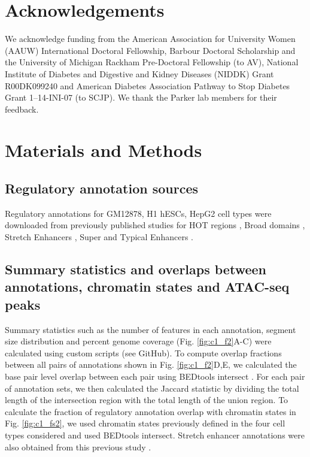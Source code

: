 \section{Acknowledgements}
We acknowledge funding from the American Association for University Women (AAUW) International Doctoral Fellowship, Barbour Doctoral Scholarship and the University of Michigan Rackham Pre-Doctoral Fellowship (to AV), National Institute of Diabetes and Digestive and Kidney Diseases (NIDDK) Grant R00DK099240 and American Diabetes Association Pathway to Stop Diabetes Grant 1–14-INI-07 (to SCJP). We thank the Parker lab members for their feedback.

\section{Materials and Methods}

\subsection{Regulatory annotation sources}
Regulatory annotations for GM12878, H1 hESCs, HepG2 cell types were downloaded from previously published studies for HOT regions \cite{boyleComparativeAnalysisRegulatory2014}, Broad domains \cite{benayounH3K4me3BreadthLinked2014}, Stretch Enhancers \cite{varshneyGeneticRegulatorySignatures2017}, Super and Typical Enhancers \cite{hniszSuperEnhancersControlCell2013}.

\subsection{Summary statistics and overlaps between annotations, chromatin states and ATAC-seq peaks}
Summary statistics such as the number of features in each annotation, segment size distribution and percent genome coverage (Fig. \ref{fig:c1_f2}A-C) were calculated using custom scripts (see GitHub). To compute overlap fractions between all pairs of annotations shown in Fig. \ref{fig:c1_f2}D,E, we calculated the base pair level overlap between each pair using BEDtools intersect \cite{quinlanBEDToolsFlexibleSuite2010}. For each pair of annotation sets, we then calculated the Jaccard statistic by dividing the total length of the intersection region with the total length of the union region. To calculate the fraction of regulatory annotation overlap with chromatin states in Fig. \ref{fig:c1_fs2}, we used chromatin states previously defined in the four cell types considered \cite{varshneyGeneticRegulatorySignatures2017} and used BEDtools intersect. Stretch enhancer annotations were also obtained from this previous study \cite{varshneyGeneticRegulatorySignatures2017}. \\

